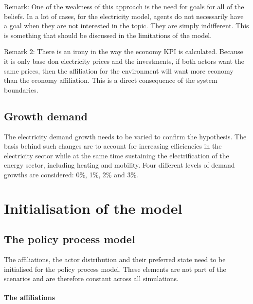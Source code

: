 \documentclass[12pt]{article}
\begin{document}
Remark: One of the weakness of this approach is the need for goals for all of the beliefs. In a lot of cases, for the electricity model, agents do not necessarily have a goal when they are not interested in the topic. They are simply indifferent. This is something that should be discussed in the limitations of the model.

Remark 2: There is an irony in the way the economy KPI is calculated. Because it is only base don electricity prices and the investments, if both actors want the same prices, then the affiliation for the environment will want more economy than the economy affiliation. This is a direct consequence of the system boundaries.


\subsection{Growth demand}

The electricity demand growth needs to be varied to confirm the hypothesis. The basis behind such changes are to account for increasing efficiencies in the electricity sector while at the same time sustaining the electrification of the energy sector, including heating and mobility. Four different levels of demand growths are considered: 0\%, 1\%, 2\% and 3\%. 



\section{Initialisation of the model}
\label{sec:elec_initialisation}


\subsection{The policy process model}

The affiliations, the actor distribution and their preferred state need to be initialised for the policy process model. These elements are not part of the scenarios and are therefore constant across all simulations.

\paragraph{The affiliations}
\end{document}
